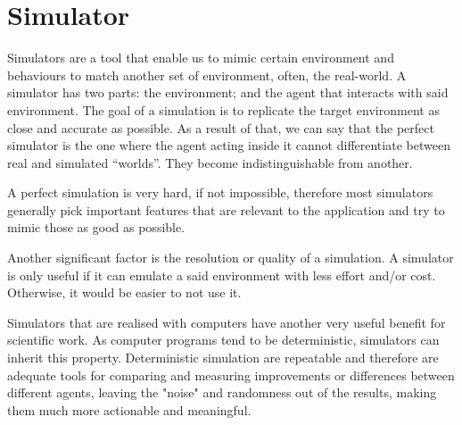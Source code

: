 \section{Simulator}

Simulators are a tool that enable us to mimic certain environment and behaviours to match another set of environment, often, the real-world. A simulator has two parts: the environment; and the agent that interacts with said environment.
The goal of a simulation is to replicate the target environment as close and accurate as possible. As a result of that, we can say that the perfect simulator is the one where the agent acting inside it cannot differentiate between real and simulated “worlds”. They become indistinguishable from another.

A perfect simulation is very hard, if not impossible, therefore most simulators generally pick important features that are relevant to the application and try to mimic those as good as possible.

Another significant factor is the resolution or quality of a simulation. A simulator is only useful if it can emulate a said environment with less effort and/or cost. Otherwise, it would be easier to not use it.

Simulators that are realised with computers have another very useful benefit for scientific work. As computer programs tend to be deterministic, simulators can inherit this property. Deterministic simulation are repeatable and therefore are adequate tools for comparing and measuring improvements or differences between different agents, leaving the "noise" and randomness out of the results, making them much more actionable and meaningful.

